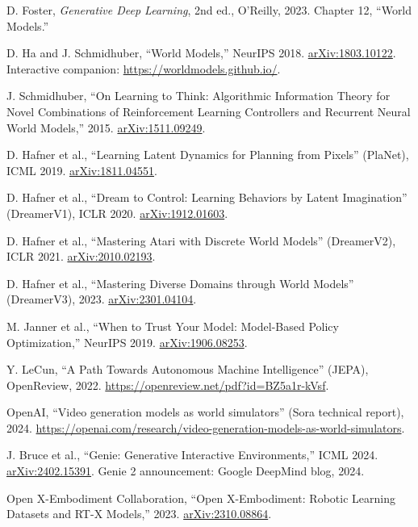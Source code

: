 \documentclass[11pt]{article}
\theoremstyle{remark}
\begin{document}
\begin{enumerate}[leftmargin=2em, label={[\arabic*]}, itemsep=2pt]
  \item D. Foster, \emph{Generative Deep Learning}, 2nd ed., O'Reilly, 2023. Chapter 12, ``World Models.''
  \item D. Ha and J. Schmidhuber, ``World Models,'' NeurIPS 2018. \href{https://arxiv.org/abs/1803.10122}{arXiv:1803.10122}. Interactive companion: \url{https://worldmodels.github.io/}.
  \item J. Schmidhuber, ``On Learning to Think: Algorithmic Information Theory for Novel Combinations of Reinforcement Learning Controllers and Recurrent Neural World Models,'' 2015. \href{https://arxiv.org/abs/1511.09249}{arXiv:1511.09249}.
  \item D. Hafner et al., ``Learning Latent Dynamics for Planning from Pixels'' (PlaNet), ICML 2019. \href{https://arxiv.org/abs/1811.04551}{arXiv:1811.04551}.
  \item D. Hafner et al., ``Dream to Control: Learning Behaviors by Latent Imagination'' (DreamerV1), ICLR 2020. \href{https://arxiv.org/abs/1912.01603}{arXiv:1912.01603}.
  \item D. Hafner et al., ``Mastering Atari with Discrete World Models'' (DreamerV2), ICLR 2021. \href{https://arxiv.org/abs/2010.02193}{arXiv:2010.02193}.
  \item D. Hafner et al., ``Mastering Diverse Domains through World Models'' (DreamerV3), 2023. \href{https://arxiv.org/abs/2301.04104}{arXiv:2301.04104}.
  \item M. Janner et al., ``When to Trust Your Model: Model-Based Policy Optimization,'' NeurIPS 2019. \href{https://arxiv.org/abs/1906.08253}{arXiv:1906.08253}.
  \item Y. LeCun, ``A Path Towards Autonomous Machine Intelligence'' (JEPA), OpenReview, 2022. \url{https://openreview.net/pdf?id=BZ5a1r-kVsf}.
  \item OpenAI, ``Video generation models as world simulators'' (Sora technical report), 2024. \url{https://openai.com/research/video-generation-models-as-world-simulators}.
  \item J. Bruce et al., ``Genie: Generative Interactive Environments,'' ICML 2024. \href{https://arxiv.org/abs/2402.15391}{arXiv:2402.15391}. Genie 2 announcement: Google DeepMind blog, 2024.
  \item Open X-Embodiment Collaboration, ``Open X-Embodiment: Robotic Learning Datasets and RT-X Models,'' 2023. \href{https://arxiv.org/abs/2310.08864}{arXiv:2310.08864}.

\end{enumerate}
\end{document}
